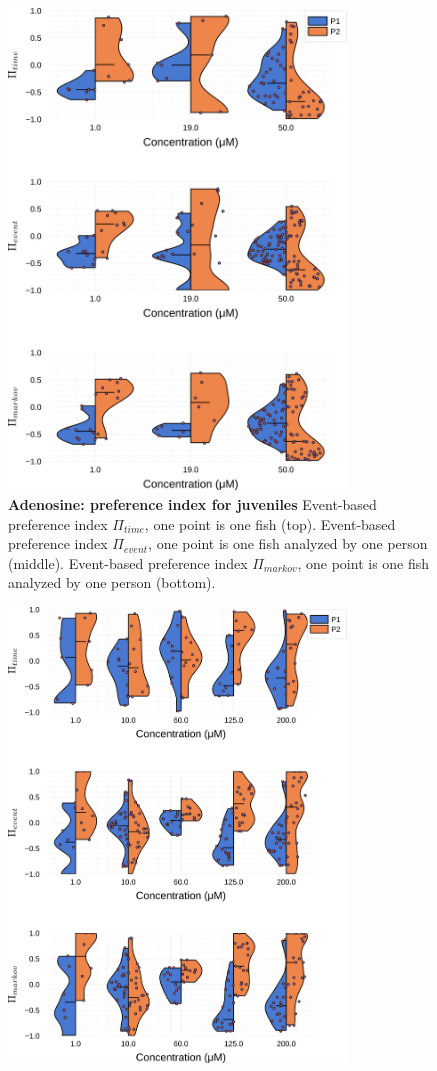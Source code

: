 \begin{appendices}
\begin{figure}[h]
      \includegraphics[width=0.8\textwidth]{part_2/assets/dist_adenosine.png}
      \caption{\textbf{Adenosine: preference index for juveniles} Event-based preference index $\Pi_{time}$, one point is one fish (top). Event-based preference index $\Pi_{event}$, one point is one fish analyzed by one person (middle). Event-based preference index $\Pi_{markov}$, one point is one fish analyzed by one person (bottom).}
      \label{dist_adenosine}
    \end{figure}
    \begin{figure}[h]
      \centering
      \includegraphics[width=0.8\textwidth]{part_2/assets/dist_atp.png}

\end{figure}
\end{appendices}
